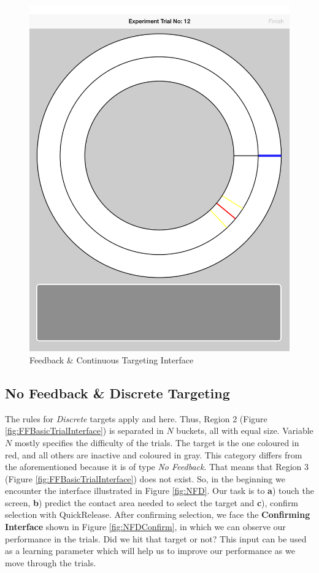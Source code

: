 \begin{figure}[H]
\centering
\includegraphics[scale=0.07]{figures/FND.png}
\caption{Feedback \& Continuous Targeting Interface}
\label{fig:FND}
\end{figure}

\subsection{No Feedback \& Discrete Targeting}

The rules for \emph{Discrete} targets apply and here. Thus, Region 2 (Figure \ref{fig:FFBasicTrialInterface}) is separated in $N$ buckets, all with equal size. Variable $N$ mostly specifies the difficulty of the trials. The target is the one coloured in red, and all others are inactive and coloured in gray. This category differs from the aforementioned because it is of type \emph{No Feedback}. That means that Region 3 (Figure \ref{fig:FFBasicTrialInterface}) does not exist. So, in the beginning we encounter the interface illustrated in Figure \ref{fig:NFD}. Our task  is to \textbf{a}) touch the screen, \textbf{b}) predict the contact area needed to select the target and \textbf{c}), confirm selection with QuickRelease. After confirming selection, we face the \textbf{Confirming Interface} shown in Figure \ref{fig:NFDConfirm}, in which we can observe our performance in the trials. Did we hit that target or not? This input can be used as a learning parameter which will help us to improve our performance as we move through the trials.

